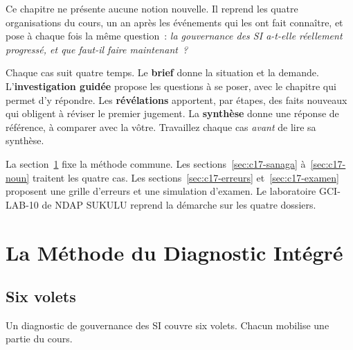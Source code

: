 Ce chapitre ne présente aucune notion nouvelle. Il reprend les quatre
organisations du cours, un an après les événements qui les ont fait
connaître, et pose à chaque fois la même question~: \emph{la gouvernance
des SI a-t-elle réellement progressé, et que faut-il faire maintenant~?}

Chaque cas suit quatre temps. Le \textbf{brief} donne la situation et la
demande. L'\textbf{investigation guidée} propose les questions à se poser,
avec le chapitre qui permet d'y répondre. Les \textbf{révélations} apportent,
par étapes, des faits nouveaux qui obligent à réviser le premier
jugement. La \textbf{synthèse} donne une réponse de référence, à comparer
avec la vôtre. Travaillez chaque cas \emph{avant} de lire sa synthèse.

La section~\ref{sec:c17-methode} fixe la méthode commune. Les
sections~\ref{sec:c17-sanaga} à~\ref{sec:c17-noun} traitent les quatre
cas. Les sections~\ref{sec:c17-erreurs} et~\ref{sec:c17-examen}
proposent une grille d'erreurs et une simulation d'examen. Le laboratoire
GCI-LAB-10 de NDAP SUKULU reprend la démarche sur les quatre dossiers.

\separateur

\section{La Méthode du Diagnostic Intégré}
\label{sec:c17-methode}

\subsection{Six volets}

Un diagnostic de gouvernance des SI couvre six volets. Chacun mobilise une
partie du cours.

